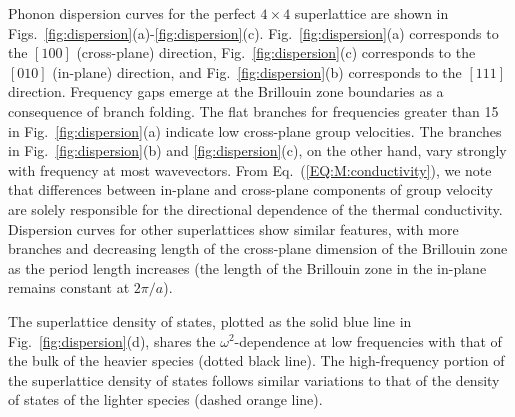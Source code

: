 \documentclass[aps,prb,preprint,preprintnumbers,amsmath,amssymb,floatfix,superscriptaddress]{revtex4}
\begin{document}
Phonon dispersion curves for the perfect $4\times4$ superlattice are shown in Figs.~\ref{fig:dispersion}(a)-\ref{fig:dispersion}(c). Fig.~\ref{fig:dispersion}(a) corresponds to the $[1 0 0]$ (cross-plane) direction, Fig.~\ref{fig:dispersion}(c) corresponds to the $[0 1 0]$ (in-plane) direction, and Fig.~\ref{fig:dispersion}(b) corresponds to the $[1 1 1]$ direction. Frequency gaps emerge at the Brillouin zone boundaries as a consequence of branch folding.\cite{PhysRevB.38.1427,PhysRevB.60.2627} The flat branches for frequencies greater than 15 in Fig.~\ref{fig:dispersion}(a) indicate low cross-plane group velocities. The branches in Fig.~\ref{fig:dispersion}(b) and \ref{fig:dispersion}(c), on the other hand, vary strongly with frequency at most wavevectors. From Eq.~(\ref{EQ:M:conductivity}), we note that differences between in-plane and cross-plane components of group velocity are solely responsible for the directional dependence of the thermal conductivity.  Dispersion curves for other superlattices show similar features, with more branches and decreasing length of the cross-plane dimension of the Brillouin zone as the period length increases (the length of the Brillouin zone in the in-plane remains constant at $2\pi/a$).
\renewcommand{\topfraction}{0.7}
\begin{figure*}%
\begin{center}
\renewcommand{\figure}{Fig.}
\caption{(a),(b),(c) Dispersion, (d) density of states and (e) inverse participation ratio for a $4\times4$ superlattice. Labeled gray squares represent select modes for Fig.~\ref{fig:sed}. {\color{red}Frequency is expressed in terms of the LJ potential parameters as $\omega=\omega^*\sqrt{\sigma^2m/\epsilon}$, where $\omega^*$ is the frequency in units of Hertz.} }
\label{fig:dispersion}
\end{center}
\end{figure*}
The superlattice density of states, plotted as the solid blue line in Fig.~\ref{fig:dispersion}(d), shares the $\omega^2$-dependence at low frequencies with that of the bulk of the heavier species (dotted black line). The high-frequency portion of the superlattice density of states follows similar variations to that of the density of states of the lighter species (dashed orange line). 
\end{document}
